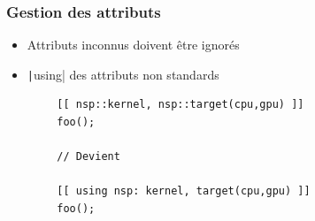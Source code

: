 \documentclass[C++.tex]{subfiles}
\begin{document}
\begin{frame}[fragile]
	\frametitle{Gestion des attributs}
	\begin{itemize}
		\item Attributs inconnus doivent être ignorés


		\item \texttt|using| des attributs non standards
	\end{itemize}

	\begin{verbatim}
		[[ nsp::kernel, nsp::target(cpu,gpu) ]]
		foo();

		// Devient

		[[ using nsp: kernel, target(cpu,gpu) ]]
		foo();
	\end{verbatim}
\end{frame}
\end{document}
